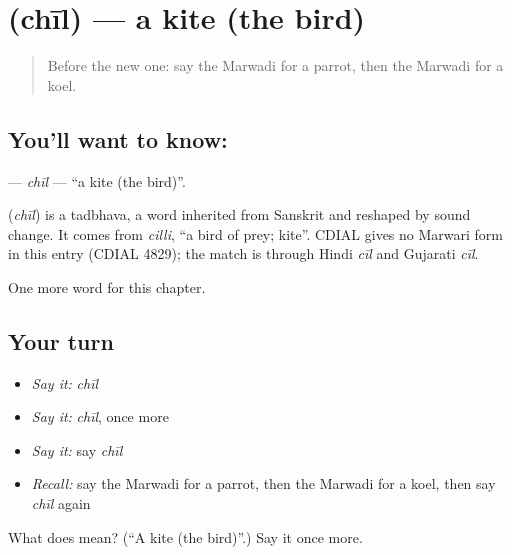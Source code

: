 \section[\texorpdfstring{\mw{चील} (chīl)}{चील (chīl)}]{ (chīl) — a kite (the bird)}

\label{lesson:MW-C139-chil}



\begin{quote}
Before the new one: say the Marwadi for a parrot, then the Marwadi for a koel.
\end{quote}

\subsection*{You'll want to know: }
\textbf{} — \emph{chīl} — \textquotedblleft{}a kite (the bird)\textquotedblright{}.

\begin{cousinweb}
\textbf{} (\emph{chīl}) is a tadbhava, a word inherited from Sanskrit and reshaped by sound change. It comes from \emph{cilli}, \textquotedblleft{}a bird of prey; kite\textquotedblright{}. CDIAL gives no Marwari form in this entry (CDIAL 4829); the match is through Hindi \emph{cīl} and Gujarati \emph{cīl}.
\end{cousinweb}

\begin{grammarlens}[title={What you've built}]
One more word for this chapter.
\end{grammarlens}

\subsection*{Your turn}
\begin{itemize}
\raggedright
  \item \emph{Say it:} \emph{chīl}
  \item \emph{Say it:} \emph{chīl}, once more
  \item \emph{Say it:} say \emph{chīl}
  \item \emph{Recall:} say the Marwadi for a parrot, then the Marwadi for a koel, then say \emph{chīl} again
\end{itemize}

\begin{tcolorbox}[breakable,colback=teal!4,colframe=teal!35!black,title={Before you move on}]
What does  mean? (\textquotedblleft{}A kite (the bird)\textquotedblright{}.) Say it once more.
\end{tcolorbox}
